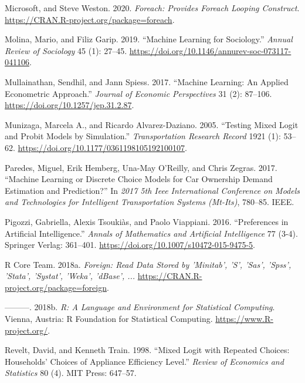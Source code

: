 \documentclass[12pt,]{article}
\begin{document}
\leavevmode\hypertarget{ref-R-foreach}{}%
Microsoft, and Steve Weston. 2020. \emph{Foreach: Provides Foreach
Looping Construct}. \url{https://CRAN.R-project.org/package=foreach}.

\leavevmode\hypertarget{ref-molina2019soc}{}%
Molina, Mario, and Filiz Garip. 2019. ``Machine Learning for
Sociology.'' \emph{Annual Review of Sociology} 45 (1): 27--45.
\url{https://doi.org/10.1146/annurev-soc-073117-041106}.

\leavevmode\hypertarget{ref-mullainathan2017ml}{}%
Mullainathan, Sendhil, and Jann Spiess. 2017. ``Machine Learning: An
Applied Econometric Approach.'' \emph{Journal of Economic Perspectives}
31 (2): 87--106. \url{https://doi.org/10.1257/jep.31.2.87}.

\leavevmode\hypertarget{ref-munizaga2005mlyp}{}%
Munizaga, Marcela A., and Ricardo Alvarez-Daziano. 2005. ``Testing Mixed
Logit and Probit Models by Simulation.'' \emph{Transportation Research
Record} 1921 (1): 53--62.
\url{https://doi.org/10.1177/0361198105192100107}.

\leavevmode\hypertarget{ref-paredes2017machine}{}%
Paredes, Miguel, Erik Hemberg, Una-May O'Reilly, and Chris Zegras. 2017.
``Machine Learning or Discrete Choice Models for Car Ownership Demand
Estimation and Prediction?'' In \emph{2017 5th Ieee International
Conference on Models and Technologies for Intelligent Transportation
Systems (Mt-Its)}, 780--85. IEEE.

\leavevmode\hypertarget{ref-pigozzi2016pai}{}%
Pigozzi, Gabriella, Alexis Tsoukiàs, and Paolo Viappiani. 2016.
``Preferences in Artificial Intelligence.'' \emph{Annals of Mathematics
and Artificial Intelligence} 77 (3-4). Springer Verlag: 361--401.
\url{https://doi.org/10.1007/s10472-015-9475-5}.

\leavevmode\hypertarget{ref-R-foreign}{}%
R Core Team. 2018a. \emph{Foreign: Read Data Stored by 'Minitab', 'S',
'Sas', 'Spss', 'Stata', 'Systat', 'Weka', 'dBase', ...}
\url{https://CRAN.R-project.org/package=foreign}.

\leavevmode\hypertarget{ref-R-base}{}%
---------. 2018b. \emph{R: A Language and Environment for Statistical
Computing}. Vienna, Austria: R Foundation for Statistical Computing.
\url{https://www.R-project.org/}.

\leavevmode\hypertarget{ref-revelt1998mixed}{}%
Revelt, David, and Kenneth Train. 1998. ``Mixed Logit with Repeated
Choices: Households' Choices of Appliance Efficiency Level.''
\emph{Review of Economics and Statistics} 80 (4). MIT Press: 647--57.
\end{document}
